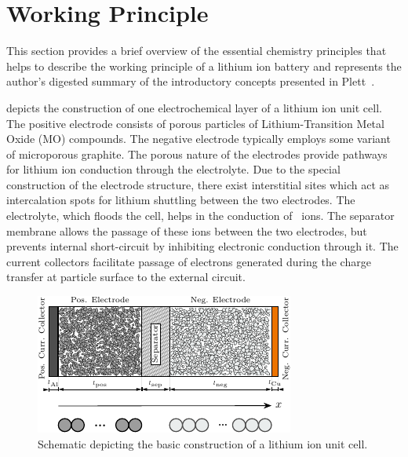 

\section{Working Principle}\label{subsec:liionchemistry}

This section  provides a  brief overview of  the essential  chemistry principles
that  helps  to  describe the  working  principle  of  a  lithium ion  battery 
and represents the author's digested summary  of the introductory concepts
presented in Plett~\cite{Plett2015}.

 depicts the construction of one electrochemical
layer of a lithium ion unit cell. The positive electrode consists of porous
particles of  Lithium-Transition  Metal  Oxide  (MO)  compounds.  The  negative 
electrode typically employs some variant of microporous graphite. The porous
nature of the electrodes provide pathways for lithium  ion conduction through
the electrolyte. Due  to  the  special  construction  of the  electrode 
structure,  there  exist interstitial  sites  which act  as  intercalation 
spots for  lithium  shuttling between the two electrodes. The electrolyte, which
floods the cell, helps in the conduction of ~ions. The separator
membrane allows the passage of these ions  between  the  two  electrodes,  but 
prevents  internal  short-circuit  by inhibiting electronic  conduction through
it. The  current collectors facilitate passage of electrons generated during the
charge transfer at particle surface to the external circuit.

\begin{figure}[!htbp]
    \centering
    \includegraphics[width=\textwidth]{cropped_cell_sandwich_for_thesis}
    \caption[Illustration of a lithium ion unit cell]{Schematic depicting the
    basic construction of a lithium ion unit cell.}
    \label{fig:chargetransferprocess}
\end{figure}

